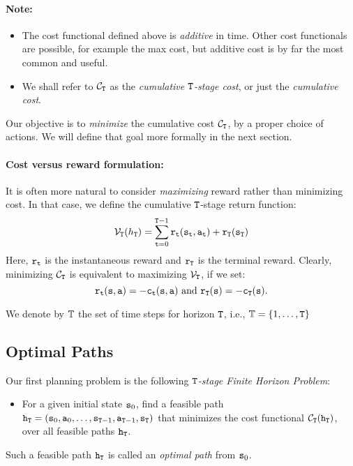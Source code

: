 \paragraph{Note:}
\begin{itemize}
  \item The cost functional defined above is \emph{additive} in time. Other cost functionals are possible, for example the max cost, but additive cost is by far the most common and useful.
  \item We shall refer to ${\mathcal{C}_{\tt T}}$ as the \emph{cumulative ${\tt T}$-stage cost}, or just the \emph{cumulative cost}.
\end{itemize}

Our objective is to \emph{minimize} the cumulative cost
${\mathcal{C}_{\tt T}}$, by a proper choice of actions. We will define
that goal more formally in the next section.

\paragraph{Cost versus reward formulation: }
It is often more natural to consider \emph{maximizing} reward rather
than minimizing cost.  In that case, we define the cumulative
${\tt T}$-stage return function:
$${\mathcal{V}_{\tt T}}({h_{\tt T}}) = \sum_{{\tt t} = 0}^{{\tt T} - 1} {{{\tt r}_{{\tt t}}}({{\tt s}_{{\tt t}}},{{\tt a}_{{\tt t}}}) + {{\tt r}_{\tt T}}({{\tt s}_{\tt T}})} $$
Here, ${{\tt r}_{{\tt t}}}$ is the instantaneous reward and
${{\tt r}_{\tt T}}$ is the terminal reward. Clearly, minimizing
${\mathcal{C}_{\tt T}}$ is equivalent to maximizing
${\mathcal{V}_{\tt T}}$, if we set:
$${{\tt r}_{{\tt t}}}({\tt s},{\tt a}) =  - {{\tt c}_{{\tt t}}}({\tt s},{\tt a}) \text{ and }{{\tt r}_{\tt T}}({\tt s}) =  - {{\tt c}_{\tt T}}({\tt s}).$$

We denote by $\mathbb{T}$ the set of time steps for horizon ${\tt T}$, i.e.,
$\mathbb{T}=\{1, \ldots, {\tt T}\}$


\subsection{Optimal Paths}

Our first planning problem is the following \emph{${\tt T}$-stage
Finite Horizon Problem}:
\begin{itemize}
\item For a given initial state ${{\tt s}_0}$, find a feasible path
  ${{\tt h}_{\tt T}} = ({{\tt s}_0},{{\tt a}_0}, \ldots ,{{\tt s}_{{\tt T} - 1}},{{\tt a}_{{\tt T} - 1}},{{\tt s}_{\tt T}})$
  that minimizes the cost functional ${\mathcal{C}_{\tt T}}({{\tt h}_{\tt T}})$, over all feasible paths ${{\tt h}_{\tt T}}$.
\end{itemize}
%
Such a feasible path ${{\tt h}_{\tt T}}$ is called an
\emph{optimal path} from ${{\tt s}_0}$.

